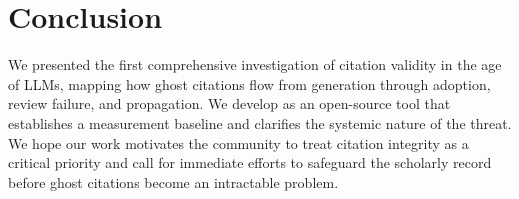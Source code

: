 \section{Conclusion}
\label{sec:conclusion}

We presented the first comprehensive investigation of citation validity in the age of LLMs, mapping how ghost citations flow from generation through adoption, review failure, and propagation.
We develop \citeb as an open-source tool that establishes a measurement baseline and clarifies the systemic nature of the threat.
We hope our work motivates the community to treat citation integrity as a critical priority and call for immediate efforts to safeguard the scholarly record before ghost citations become an intractable problem.